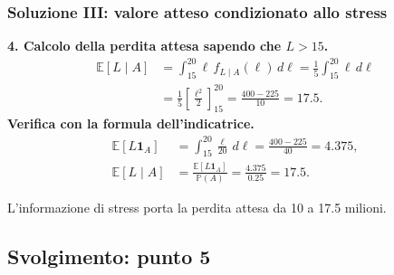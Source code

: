 \documentclass[handout]{beamer}%
\providecommand{\E}{\mathbb{E}}
\providecommand{\Prob}{\mathbb{P}}
\providecommand{\1}{\mathbf{1}}
\providecommand{\QTR}[2]{\csname #1\endcsname{#2}}
\begin{document}
\begin{frame}%
\frametitle{Soluzione III: valore atteso condizionato allo stress}
%


\textbf{4. Calcolo della perdita attesa sapendo che $L>15$.}
\[
\begin{aligned}
\E[L\mid A]
&=\int_{15}^{20}\ell\,f_{L\mid A}(\ell)\,d\ell
=\frac15\int_{15}^{20}\ell\,d\ell\\
&=\frac15\left[\frac{\ell^2}{2}\right]_{15}^{20}
=\frac{400-225}{10}=17.5.
\end{aligned}
\]
\medskip\textbf{Verifica con la formula dell'indicatrice.}
\[
\begin{aligned}
\E[L\1_A]&=\int_{15}^{20}\frac{\ell}{20}\,d\ell
=\frac{400-225}{40}=4.375,\\
\E[L\mid A]&=\frac{\E[L\1_A]}{\Prob(A)}
=\frac{4.375}{0.25}=17.5.
\end{aligned}
\]


\begin{center}
\textcolor{light-blue}{L'informazione di stress porta la perdita attesa da 10 a 17.5 milioni.}
\end{center}%

\end{frame}%


\subsection{Svolgimento: punto 5}%
\end{document}
